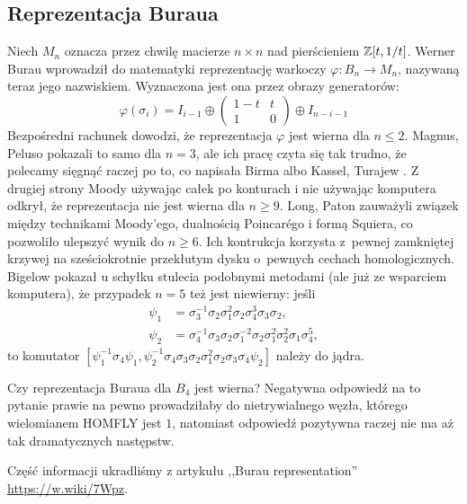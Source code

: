 
\subsection{Reprezentacja Buraua}
Niech $M_n$ oznacza przez chwilę macierze $n \times n$ nad pierścieniem $\mathbb Z[t, 1/t]$.
Werner Burau \cite{burau33} wprowadził do matematyki reprezentację warkoczy $\varphi \colon B_n \to M_{n}$, nazywaną teraz jego nazwiskiem.
%
%
Wyznaczona jest ona przez obrazy generatorów:
\begin{equation}
    \varphi(\sigma_i) = I_{i-1} \oplus \begin{pmatrix}
        1-t & t \\
        1   & 0
    \end{pmatrix} \oplus I_{n-i-1}
\end{equation}
Bezpośredni rachunek dowodzi, że reprezentacja $\varphi$ jest wierna dla $n \le 2$.
Magnus, Peluso \cite{peluso69} pokazali to samo dla $n = 3$, ale ich pracę czyta się tak trudno, że polecamy sięgnąć raczej po to, co napisała Birma \cite[s. 129]{birman74} albo Kassel, Turajew \cite[s. 110]{kassel08}.
Z drugiej strony Moody \cite{moody91} używając całek po konturach i nie używając komputera odkrył, że reprezentacja nie jest wierna dla $n \ge 9$.
%
Long, Paton \cite{paton93} zauważyli związek między technikami Moody'ego, dualnością Poincarégo i formą Squiera, co pozwoliło ulepszyć wynik do $n \ge 6$.
%
%
Ich kontrukcja korzysta z~pewnej zamkniętej krzywej na sześciokrotnie przekłutym dysku o~pewnych cechach homologicznych.
Bigelow \cite{bigelow99} pokazał u schyłku stulecia podobnymi metodami (ale już ze wsparciem komputera), że przypadek $n = 5$ też jest niewierny: jeśli
%
\begin{align}
    \psi_1 & = \sigma_3^{{-1}}\sigma_2\sigma_1^2\sigma_2\sigma_4^3\sigma_3\sigma_2, \\
\psi_2 & = \sigma_4^{{-1}}\sigma_3\sigma_2\sigma_1^{{-2}}\sigma_2\sigma_1^2\sigma_2^2\sigma_1\sigma_4^5,
\end{align}
to komutator $[\psi_1^{{-1}}\sigma_4\psi_1,\psi_2^{{-1}}\sigma_4\sigma_3\sigma_2\sigma_1^2\sigma_2\sigma_3\sigma_4\psi_2]$ należy do jądra.

Czy reprezentacja Buraua dla $B_4$ jest wierna?
Negatywna odpowiedź na to pytanie prawie na pewno prowadziłaby do
nietrywialnego węzła, którego wielomianem HOMFLY jest $1$,
natomiast odpowiedź pozytywna raczej nie ma aż tak dramatycznych następstw.

Część informacji ukradliśmy z artykułu ,,Burau representation'' \url{https://w.wiki/7Wpz}.

